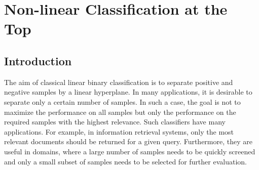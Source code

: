 \chapter{Non-linear Classification at the Top}

\section{Introduction}
    
The aim of classical linear binary classification is to separate positive and negative samples by a linear hyperplane. In many applications, it is desirable to separate only a certain number of samples. In such a case, the goal is not to maximize the performance on all samples but only the performance on the required samples with the highest relevance. Such classifiers have many applications. For example, in information retrieval systems, only the most relevant documents should be returned for a given query. Furthermore, they are useful in domains, where a large number of samples needs to be quickly screened and only a small subset of samples needs to be selected for further evaluation.

